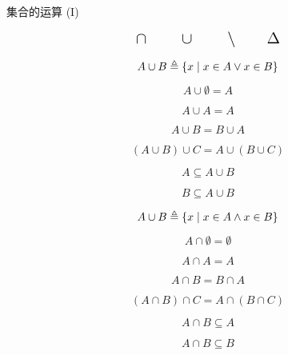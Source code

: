 
\begin{frame}{}
  \begin{center}
    {\Large 集合的运算 (I)}
  \end{center}

  \[
    \text{\Large $\cap \qquad \cup \qquad \setminus \qquad \Delta$}
  \]
\end{frame}

\begin{frame}{}
  \begin{definition}
    \[
      A \cup B \triangleq \{x \mid x \in A \lor x \in B\}
    \]
  \end{definition}

  \vspace{0.30cm}
\end{frame}

\begin{frame}{}
  \[
    A \cup \emptyset = A
  \]

  \pause
  \[
    A \cup A = A
  \]

  \[
    A \cup B = B \cup A
  \]

  \[
    (A \cup B) \cup C = A \cup (B \cup C)
  \]

  \pause
  \[
    A \subseteq A \cup B
  \]

  \[
    B \subseteq A \cup B
  \]
\end{frame}

\begin{frame}{}
  \begin{definition}
    \[
      A \cup B \triangleq \{x \mid x \in A \land x \in B\}
    \]
  \end{definition}

  \vspace{0.30cm}
\end{frame}

\begin{frame}{}
  \[
    A \cap \emptyset = \emptyset
  \]

  \pause
  \[
    A \cap A = A
  \]

  \[
    A \cap B = B \cap A
  \]

  \[
    (A \cap B) \cap C = A \cap (B \cap C)
  \]

  \pause
  \[
    A \cap B \subseteq A
  \]

  \[
    A \cap B \subseteq B
  \]
\end{frame}

